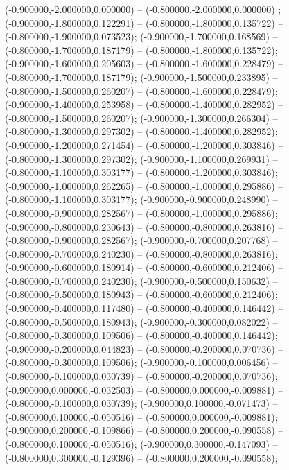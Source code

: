  (-0.900000,-2.000000,0.000000) -- (-0.800000,-2.000000,0.000000) ;
 (-0.900000,-1.800000,0.122291) -- (-0.800000,-1.800000,0.135722) -- (-0.800000,-1.900000,0.073523);
 (-0.900000,-1.700000,0.168569) -- (-0.800000,-1.700000,0.187179) -- (-0.800000,-1.800000,0.135722);
 (-0.900000,-1.600000,0.205603) -- (-0.800000,-1.600000,0.228479) -- (-0.800000,-1.700000,0.187179);
 (-0.900000,-1.500000,0.233895) -- (-0.800000,-1.500000,0.260207) -- (-0.800000,-1.600000,0.228479);
 (-0.900000,-1.400000,0.253958) -- (-0.800000,-1.400000,0.282952) -- (-0.800000,-1.500000,0.260207);
 (-0.900000,-1.300000,0.266304) -- (-0.800000,-1.300000,0.297302) -- (-0.800000,-1.400000,0.282952);
 (-0.900000,-1.200000,0.271454) -- (-0.800000,-1.200000,0.303846) -- (-0.800000,-1.300000,0.297302);
 (-0.900000,-1.100000,0.269931) -- (-0.800000,-1.100000,0.303177) -- (-0.800000,-1.200000,0.303846);
 (-0.900000,-1.000000,0.262265) -- (-0.800000,-1.000000,0.295886) -- (-0.800000,-1.100000,0.303177);
 (-0.900000,-0.900000,0.248990) -- (-0.800000,-0.900000,0.282567) -- (-0.800000,-1.000000,0.295886);
 (-0.900000,-0.800000,0.230643) -- (-0.800000,-0.800000,0.263816) -- (-0.800000,-0.900000,0.282567);
 (-0.900000,-0.700000,0.207768) -- (-0.800000,-0.700000,0.240230) -- (-0.800000,-0.800000,0.263816);
 (-0.900000,-0.600000,0.180914) -- (-0.800000,-0.600000,0.212406) -- (-0.800000,-0.700000,0.240230);
 (-0.900000,-0.500000,0.150632) -- (-0.800000,-0.500000,0.180943) -- (-0.800000,-0.600000,0.212406);
 (-0.900000,-0.400000,0.117480) -- (-0.800000,-0.400000,0.146442) -- (-0.800000,-0.500000,0.180943);
 (-0.900000,-0.300000,0.082022) -- (-0.800000,-0.300000,0.109506) -- (-0.800000,-0.400000,0.146442);
 (-0.900000,-0.200000,0.044823) -- (-0.800000,-0.200000,0.070736) -- (-0.800000,-0.300000,0.109506);
 (-0.900000,-0.100000,0.006456) -- (-0.800000,-0.100000,0.030739) -- (-0.800000,-0.200000,0.070736);
 (-0.900000,0.000000,-0.032503) -- (-0.800000,0.000000,-0.009881) -- (-0.800000,-0.100000,0.030739);
 (-0.900000,0.100000,-0.071473) -- (-0.800000,0.100000,-0.050516) -- (-0.800000,0.000000,-0.009881);
 (-0.900000,0.200000,-0.109866) -- (-0.800000,0.200000,-0.090558) -- (-0.800000,0.100000,-0.050516);
 (-0.900000,0.300000,-0.147093) -- (-0.800000,0.300000,-0.129396) -- (-0.800000,0.200000,-0.090558);
